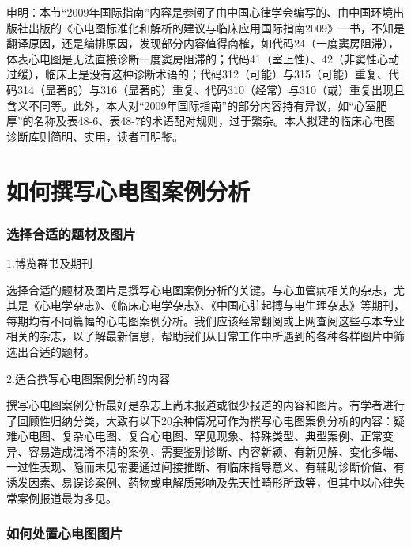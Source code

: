 申明：本节“2009年国际指南”内容是参阅了由中国心律学会编写的、由中国环境出版社出版的《心电图标准化和解析的建议与临床应用国际指南2009》一书，不知是翻译原因，还是编排原因，发现部分内容值得商榷，如代码24（一度窦房阻滞），体表心电图是无法直接诊断一度窦房阻滞的；代码41（室上性）、42（非窦性心动过缓），临床上是没有这种诊断术语的；代码312（可能）与315（可能）重复、代码314（显著的）与316（显著的）重复、代码310（经常）与310（或）重复出现且含义不同等。此外，本人对“2009年国际指南”的部分内容持有异议，如“心室肥厚”的名称及表48-6、表48-7的术语配对规则，过于繁杂。本人拟建的临床心电图诊断库则简明、实用，读者可明鉴。

\protect\hypertarget{text00058.html}{}{}

\protect\hypertarget{text00058.htmlux5cux23chapter58}{}{}

\chapter{如何撰写心电图案例分析}

\protect\hypertarget{text00058.htmlux5cux23subid710}{}{}

\subsection{选择合适的题材及图片}

1.博览群书及期刊

选择合适的题材及图片是撰写心电图案例分析的关键。与心血管病相关的杂志，尤其是《心电学杂志》、《临床心电学杂志》、《中国心脏起搏与电生理杂志》等期刊，每期均有不同篇幅的心电图案例分析。我们应该经常翻阅或上网查阅这些与本专业相关的杂志，以了解最新信息，帮助我们从日常工作中所遇到的各种各样图片中筛选出合适的题材。

2.适合撰写心电图案例分析的内容

撰写心电图案例分析最好是杂志上尚未报道或很少报道的内容和图片。有学者进行了回顾性归纳分类，大致有以下20余种情况可作为撰写心电图案例分析的内容：疑难心电图、复杂心电图、复合心电图、罕见现象、特殊类型、典型案例、正常变异、容易造成混淆不清的案例、需要鉴别诊断、内容新颖、有新见解、变化多端、一过性表现、隐而未见需要通过间接推断、有临床指导意义、有辅助诊断价值、有诱发因素、易误诊案例、药物或电解质影响及先天性畸形所致等，但其中以心律失常案例报道最为多见。

\protect\hypertarget{text00058.htmlux5cux23subid711}{}{}

\subsection{如何处置心电图图片}


